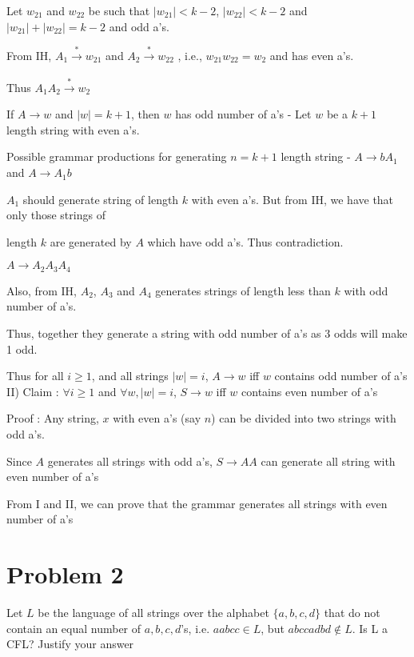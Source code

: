 \documentclass{article}
\begin{document}
    \qquad Let $w_{21}$ and $w_{22}$ be such that $|w_{21}| < k-2$, $|w_{22}| < k-2 $ and $|w_{21}| + |w_{22}| = k-2$ and odd a's.
    
    \qquad From IH, $A_{1} \xrightarrow[]{*} w_{21}$ and $A_{2} \xrightarrow[]{*} w_{22}$ , i.e.,  $w_{21}w_{22} = w_{2}$ and has even a's.
    
    \qquad Thus $A_{1}A_{2} \xrightarrow{*} w_{2}$
    
    \qquad If $A \rightarrow w$ and $|w| = k+1$, then $w$ has odd number of a's -   Let $w$ be a $k+1$ length string with even a's. 
    
    \qquad Possible grammar productions for generating $n = k+1$ length string - $A \rightarrow bA_{1} $ and $A \rightarrow A_{1}b $
    
    \qquad $A_{1}$ should generate string of length $k$ with even a's. But from IH, we have that only those strings of 
    
    \qquad length $k$ are generated by $A$ which have odd a's. Thus contradiction. 

    \qquad$A \rightarrow A_{2}A_{3}A_{4} $
    
    \qquad Also, from IH, $A_{2}$, $A_{3}$ and $A_{4}$ generates strings of length less than $k$ with odd number of a's. 
    
    \qquad Thus, together they generate a string with odd number of a's as 3 odds will make 1 odd.
     
    \quad Thus for all $i \geq 1$, and all strings $|w| = i$, $A \rightarrow w$ iff $w$ contains odd number of a's\\

    II) Claim :  $\forall i \geq 1$ and $\forall w, |w| = i$, $S \rightarrow w$ iff $w$ contains even number of a's
    
    \quad Proof : Any string, $x$ with even a's (say $n$) can be divided into two strings with odd a's.
    
    \quad Since $A$ generates all strings with odd a's, $S \rightarrow AA$ can generate all string with even number of a's
    
    From I and II, we can prove that the grammar generates all strings with even number of a's
    
    \section*{Problem 2} Let $L$ be the language of all strings over the alphabet $\{a, b, c, d\}$ that do not contain an equal number of $a, b, c, d$'s, i.e. $aabcc \in L$, but $abccadbd \notin L$. Is L a CFL? Justify your answer
    
\end{document}
